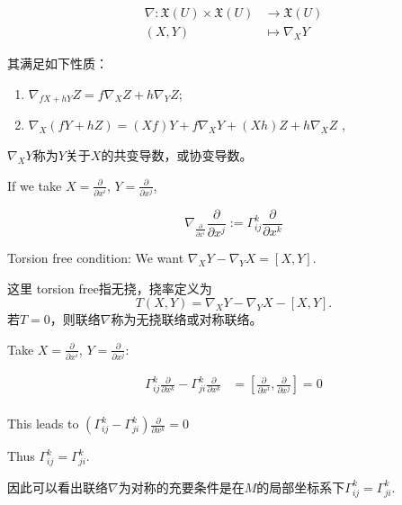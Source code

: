 \begin{equation*}
    \begin{aligned}
        \nabla: \mathfrak{X}(U) \times \mathfrak{X}(U) &\rightarrow \mathfrak{X}(U)\\
(X, Y) &\mapsto \nabla_X Y
    \end{aligned}
\end{equation*}
\begin{remark}
其满足如下性质：

\begin{enumerate}
\item[(i)] $\nabla_{fX + hY} Z = f \nabla_X Z + h \nabla_Y Z$; 
\item[(ii)] $\nabla_X (fY + hZ) = (Xf)Y + f \nabla_X Y + (Xh)Z + h \nabla_X Z$ ,
\end{enumerate} 


$\nabla_X Y$称为$Y$关于$X$的共变导数，或协变导数。
\end{remark}


If we take $X = \frac{\partial}{\partial x^i}$, $Y = \frac{\partial}{\partial x^j}$,

\[
\nabla_{\frac{\partial}{\partial x^i}} \frac{\partial}{\partial x^j} 
:= \Gamma_{ij}^k \frac{\partial}{\partial x^k}
\]

Torsion free condition:
We want $\nabla_X Y - \nabla_Y X = [X, Y]$.
\begin{remark}
    这里 torsion free指无挠，挠率定义为
\[T(X,Y)=\nabla_X Y - \nabla_Y X-[X,Y].\]
若$T=0$，则联络$\nabla$称为无挠联络或对称联络。
\end{remark}


Take $X = \frac{\partial}{\partial x^i}$, $Y = \frac{\partial}{\partial x^j}$:

\begin{equation*}
\begin{aligned}
\Gamma_{ij}^k \frac{\partial}{\partial x^k} - \Gamma_{ji}^k \frac{\partial}{\partial x^k} 
&= \left[\frac{\partial}{\partial x^i}, \frac{\partial}{\partial x^j}\right] = 0 \\
\end{aligned}
\end{equation*}

This leads to $(\Gamma_{ij}^k - \Gamma_{ji}^k) \frac{\partial}{\partial x^k} = 0 $

Thus $ \Gamma_{ij}^k = \Gamma_{ji}^k$.

\begin{remark}
    因此可以看出联络$\nabla$为对称的充要条件是在$M$的局部坐标系下$ \Gamma_{ij}^k = \Gamma_{ji}^k$.
\end{remark}


